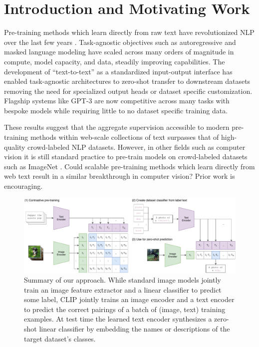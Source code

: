\documentclass{article}
\begin{document}
\section{Introduction and Motivating Work}



Pre-training methods which learn directly from raw text have revolutionized NLP over the last few years \citep{dai2015semi,peters2018deep,howard2018universal,radford2018improving,devlin2018bert,raffel2019exploring}. Task-agnostic objectives such as autoregressive and masked language modeling have scaled across many orders of magnitude in compute, model capacity, and data, steadily improving capabilities. The development of ``text-to-text'' as a standardized input-output interface \citep{mccann2018natural,radford2019language,raffel2019exploring} has enabled task-agnostic architectures to zero-shot transfer to downstream datasets removing the need for specialized output heads or dataset specific customization. Flagship systems like GPT-3 \citep{brown2020language} are now competitive across many tasks with bespoke models while requiring little to no dataset specific training data.

These results suggest that the aggregate supervision accessible to modern pre-training methods within web-scale collections of text surpasses that of high-quality crowd-labeled NLP datasets. However, in other fields such as computer vision it is still standard practice to pre-train models on crowd-labeled datasets such as ImageNet \citep{imagenet_cvpr09}. Could scalable pre-training methods which learn directly from web text result in a similar breakthrough in computer vision? Prior work is encouraging.


\begin{figure}[ht]
\begin{center}
\centerline{\includegraphics[width=\textwidth]{main-diagrams.pdf}}
\caption{Summary of our approach. While standard image models jointly train an image feature extractor and a linear classifier to predict some label, CLIP jointly trains an image encoder and a text encoder to predict the correct pairings of a batch of (image, text) training examples. At test time the learned text encoder synthesizes a zero-shot linear classifier by embedding the names or descriptions of the target dataset's classes.}
\label{main_fig}
\end{center}
\vspace{-1em}
\end{figure}
\end{document}
